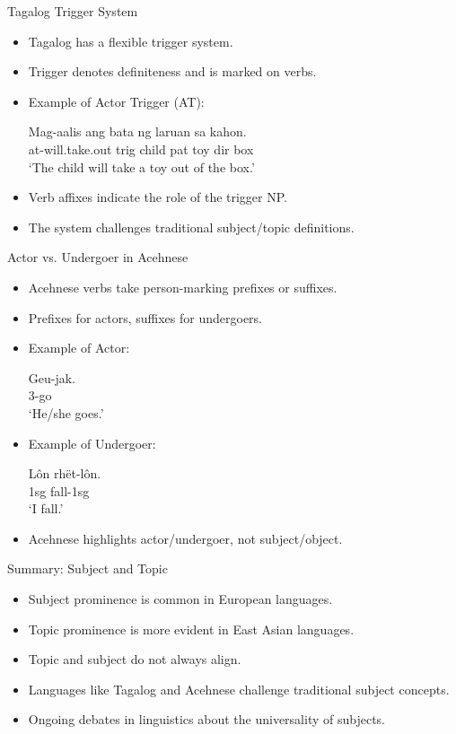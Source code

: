 \documentclass{beamer}
\begin{document}
\begin{frame}{Tagalog Trigger System}
  \begin{itemize}
    \item Tagalog has a flexible trigger system.
    \item Trigger denotes definiteness and is marked on verbs.
    \item Example of Actor Trigger (AT):
    \begin{exe}
\ex 
    \gll Mag-aalis ang bata ng laruan sa kahon. \\
         at-will.take.out trig child pat toy dir box \\
    \trans ‘The child will take a toy out of the box.’
    \end{exe}
    \item Verb affixes indicate the role of the trigger NP.
    \item The system challenges traditional subject/topic definitions.
  \end{itemize}
\end{frame}

\begin{frame}{Actor vs. Undergoer in Acehnese}
  \begin{itemize}
    \item Acehnese verbs take person-marking prefixes or suffixes.
    \item Prefixes for actors, suffixes for undergoers.
    \item Example of Actor:
    \begin{exe}
\ex 
    \gll Geu-jak. \\
         3-go \\
    \trans ‘He/she goes.’
    \end{exe}
    \item Example of Undergoer:
    \begin{exe}
\ex 
    \gll Lôn rhët-lôn. \\
         1sg fall-1sg \\
    \trans ‘I fall.’
    \end{exe}
    \item Acehnese highlights actor/undergoer, not subject/object.
  \end{itemize}
\end{frame}

\begin{frame}{Summary: Subject and Topic}
  \begin{itemize}
    \item Subject prominence is common in European languages.
    \item Topic prominence is more evident in East Asian languages.
    \item Topic and subject do not always align.
    \item Languages like Tagalog and Acehnese challenge traditional subject concepts.
    \item Ongoing debates in linguistics about the universality of subjects.
  \end{itemize}
\end{frame}
\end{document}
